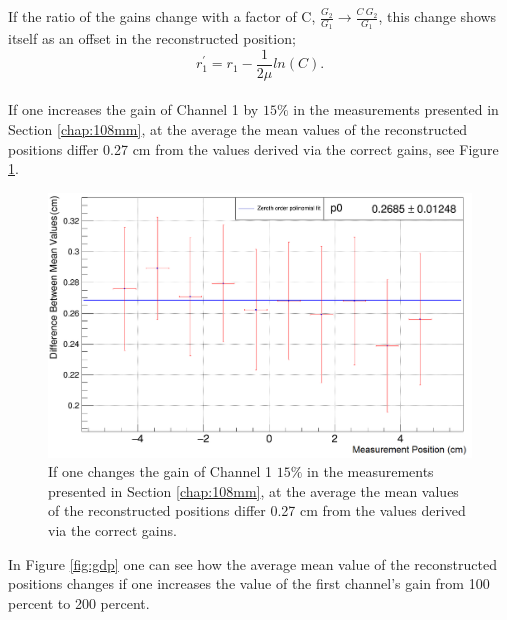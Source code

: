 \documentclass[a4paper]{article}\linespread{1.4}
\begin{document}
If the ratio of the gains change with a factor of C, $\frac{G_{2}}{G_{1}} \to \frac{C\ G_{2}}{G_{1}}$, this change shows itself as an offset in the reconstructed position;
\begin{equation}r_{1}^{'}=r_{1} - \frac{1}{2\mu} ln(C) . \end{equation}
\\If one increases the gain of Channel 1 by $15\%$ in the measurements presented in Section \ref{chap:108mm}, at the average the mean values of the reconstructed positions differ 0.27 cm from the values derived via the correct gains, see Figure \ref{fig:gd}.
\begin{figure}[] \hspace*{-1cm} \includegraphics[width=130mm,scale=1.0]{figures/gd.png} \caption{If one changes the gain of Channel 1 $15\%$ in the measurements presented in Section \ref{chap:108mm}, at the average the mean values of the reconstructed positions differ 0.27 cm from the values derived via the correct gains.} \label{fig:gd} \end{figure}  
In Figure \ref{fig:gdp} one can see how the average mean value of the reconstructed positions changes if one increases the value of the first channel's gain from 100 percent to 200 percent.
\end{document}
